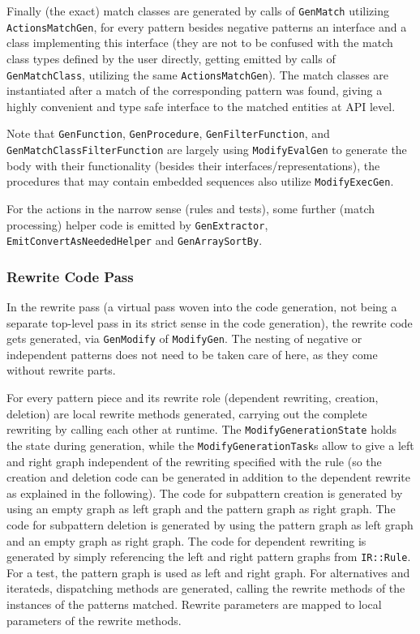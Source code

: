 Finally (the exact) match classes are generated by calls of \texttt{Gen\-Match} utilizing \texttt{Actions\-Match\-Gen}, for every pattern besides negative patterns an interface and a class implementing this interface (they are not to be confused with the match class types defined by the user directly, getting emitted by calls of \texttt{Gen\-Match\-Class}, utilizing the same \texttt{Actions\-Match\-Gen}).
The match classes are instantiated after a match of the corresponding pattern was found, giving a highly convenient and type safe interface to the matched entities at API level.

Note that \texttt{Gen\-Function}, \texttt{Gen\-Procedure}, \texttt{Gen\-Filter\-Function}, and \texttt{Gen\-Match\-Class\-Filter\-Function} are largely using \texttt{Modify\-Eval\-Gen} to generate the body with their functionality (besides their interfaces/representations), the procedures that may contain embedded sequences also utilize \texttt{Modify\-Exec\-Gen}.

For the actions in the narrow sense (rules and tests), some further (match processing) helper code is emitted by \texttt{Gen\-Extractor}, \texttt{Emit\-Convert\-As\-Needed\-Helper} and \texttt{Gen\-Array\-Sort\-By}.


\subsubsection*{Rewrite Code Pass}
In the rewrite pass (a virtual pass woven into the code generation, not being a separate top-level pass in its strict sense in the code generation), the rewrite code gets generated, via \texttt{Gen\-Modify} of \texttt{Modify\-Gen}.
The nesting of negative or independent patterns does not need to be taken care of here, as they come without rewrite parts.

For every pattern piece and its rewrite role (dependent rewriting, creation, deletion) are local rewrite methods generated, carrying out the complete rewriting by calling each other at runtime.
The \texttt{Modify\-Generation\-State} holds the state during generation, while the \texttt{Modify\-Generation\-Task}s allow to give a left and right graph independent of the rewriting specified with the rule (so the creation and deletion code can be generated in addition to the dependent rewrite as explained in the following).
The code for subpattern creation is generated by using an empty graph as left graph and the pattern graph as right graph.
The code for subpattern deletion is generated by using the pattern graph as left graph and an empty graph as right graph.
The code for dependent rewriting is generated by simply referencing the left and right pattern graphs from \texttt{IR::Rule}.
For a test, the pattern graph is used as left and right graph.
For alternatives and iterateds, dispatching methods are generated, calling the rewrite methods of the instances of the patterns matched.
Rewrite parameters are mapped to local parameters of the rewrite methods.

